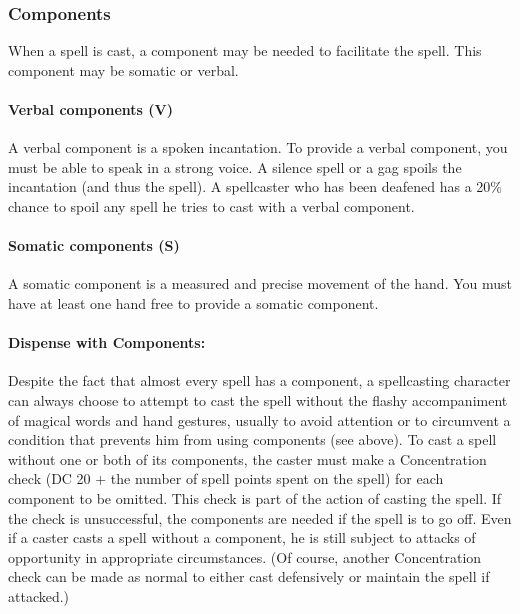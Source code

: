\subsubsection{Components}
\label{sec:Components}
When a spell is cast, a component may be needed to facilitate the spell. This component may be somatic or verbal.

\paragraph{Verbal components (V)} A verbal component is a spoken incantation. 
To provide a verbal component, you must be able to speak in a strong voice. 
A silence spell or a gag spoils the incantation (and thus the spell). 
A spellcaster who has been deafened has a 20\% chance to spoil any spell he tries to cast with a verbal component.

\paragraph{Somatic components (S)} A somatic component is a measured and precise movement of the hand. 
You must have at least one hand free to provide a somatic component.

\paragraph{Dispense with Components:} Despite the fact that almost every spell has a component, 
a spellcasting character can always choose to attempt to cast the spell without the flashy accompaniment of magical words and hand gestures, 
usually to avoid attention or to circumvent a condition that prevents him from using components (see above). 
To cast a spell without one or both of its components, the caster must make a Concentration check (DC 20 + the number of spell points spent on the spell) for each component to be omitted. 
This check is part of the action of casting the spell. If the check is unsuccessful, the components are needed if the spell is to go off.
Even if a caster casts a spell without a component, he is still subject to attacks of opportunity in appropriate circumstances. 
(Of course, another Concentration check can be made as normal to either cast defensively or maintain the spell if attacked.)


